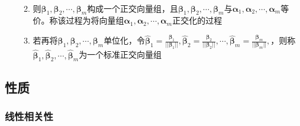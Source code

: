\documentclass[12pt]{book}
\begin{document}
\begin{enumerate}[1.]
\begin{enumerate}[(1)]
\begin{align*}
                    \end{align*}
              \item 则$\bm{\beta}_{1},\bm{\beta}_{2},\cdots,\bm{\beta}_{m}$构成一个正交向量组，且$\bm{\beta}_{1},\bm{\beta}_{2},\cdots,\bm{\beta}_{m}$与$\bm{\alpha}_{1},\bm{\alpha}_{2},\cdots,\bm{\alpha}_{m}$等价。称该过程为将向量组$\bm{\alpha}_{1},\bm{\alpha}_{2},\cdots,\bm{\alpha}_{m}$正交化的过程
              \item 若再将$\bm{\beta}_{1},\bm{\beta}_{2},\cdots,\bm{\beta}_{m}$单位化，令$\hat{\bm{\beta}}_{1}=\frac{\bm{\beta}_1}{||\bm{\beta}_1||}, \hat{\bm{\beta}}_{2}=\frac{\bm{\beta}_2}{||\bm{\beta}_2||}, \cdots, \hat{\bm{\beta}}_{m}=\frac{\bm{\beta}_m}{||\bm{\beta}_m||},$，则称$\hat{\bm{\beta}}_{1}, \hat{\bm{\beta}}_{2}, \cdots, \hat{\bm{\beta}}_{m}$为一个标准正交向量组
          \end{enumerate}
\end{enumerate}












\subsection{性质}



\subsubsection{线性相关性}
\end{document}

